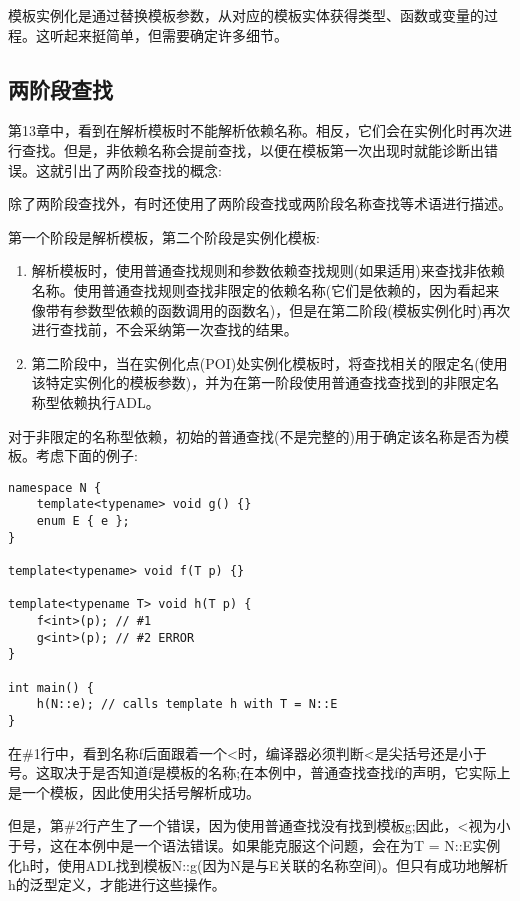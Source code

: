 
模板实例化是通过替换模板参数，从对应的模板实体获得类型、函数或变量的过程。这听起来挺简单，但需要确定许多细节。

\subsection{两阶段查找}

第13章中，看到在解析模板时不能解析依赖名称。相反，它们会在实例化时再次进行查找。但是，非依赖名称会提前查找，以便在模板第一次出现时就能诊断出错误。这就引出了两阶段查找的概念:

\begin{tcolorbox}[colback=webgreen!5!white,colframe=webgreen!75!black]
\hspace*{0.75cm}除了两阶段查找外，有时还使用了两阶段查找或两阶段名称查找等术语进行描述。
\end{tcolorbox}

第一个阶段是解析模板，第二个阶段是实例化模板:

\begin{enumerate}
\item 
解析模板时，使用普通查找规则和参数依赖查找规则(如果适用)来查找非依赖名称。使用普通查找规则查找非限定的依赖名称(它们是依赖的，因为看起来像带有参数型依赖的函数调用的函数名)，但是在第二阶段(模板实例化时)再次进行查找前，不会采纳第一次查找的结果。

\item 
第二阶段中，当在实例化点(POI)处实例化模板时，将查找相关的限定名(使用该特定实例化的模板参数)，并为在第一阶段使用普通查找查找到的非限定名称型依赖执行ADL。
\end{enumerate}

对于非限定的名称型依赖，初始的普通查找(不是完整的)用于确定该名称是否为模板。考虑下面的例子:

\begin{lstlisting}[style=styleCXX]
namespace N {
	template<typename> void g() {}
	enum E { e };
}

template<typename> void f(T p) {}

template<typename T> void h(T p) {
	f<int>(p); // #1
	g<int>(p); // #2 ERROR
}

int main() {
	h(N::e); // calls template h with T = N::E
}
\end{lstlisting}

在\#1行中，看到名称f后面跟着一个<时，编译器必须判断<是尖括号还是小于号。这取决于是否知道f是模板的名称;在本例中，普通查找查找f的声明，它实际上是一个模板，因此使用尖括号解析成功。

但是，第\#2行产生了一个错误，因为使用普通查找没有找到模板g;因此，<视为小于号，这在本例中是一个语法错误。如果能克服这个问题，会在为T = N::E实例化h时，使用ADL找到模板N::g(因为N是与E关联的名称空间)。但只有成功地解析h的泛型定义，才能进行这些操作。

